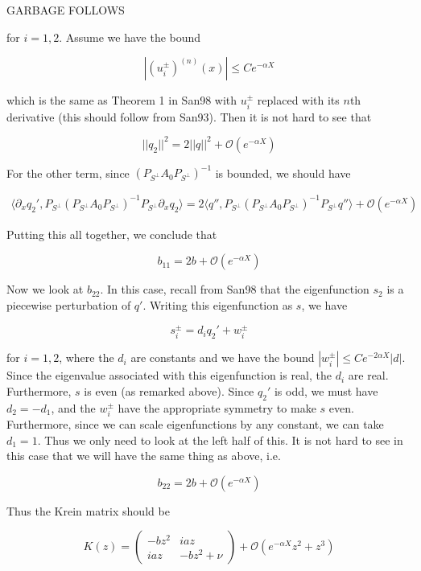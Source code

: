 \documentclass[12pt]{article}
\begin{document}
GARBAGE FOLLOWS

for $i = 1, 2$. Assume we have the bound

\[
|(u_i^\pm)^{(n)}(x)| \leq C e^{-\alpha X}
\] 

which is the same as Theorem 1 in San98 with $u_i^\pm$ replaced with its $n$th derivative (this should follow from San93). Then it is not hard to see that 

\[
||q_2||^2 = 2 ||q||^2 + \mathcal{O}(e^{-\alpha X})
\]

For the other term, since $(P_{S^\perp} A_0 P_{S^\perp})^{-1}$ is bounded, we should have

\begin{align*}
\langle \partial_x q_2', P_{S^\perp} (P_{S^\perp} A_0 P_{S^\perp})^{-1} P_{S^\perp} \partial_x q_2 \rangle 
= 2 \langle q'', P_{S^\perp} (P_{S^\perp} A_0 P_{S^\perp})^{-1} P_{S^\perp} q'' \rangle + \mathcal{O}(e^{-\alpha X})
\end{align*}

Putting this all together, we conclude that 

\[
b_{11} = 2b + \mathcal{O}(e^{-\alpha X})
\]

Now we look at $b_{22}$. In this case, recall from San98 that the eigenfunction $s_2$ is a piecewise perturbation of $q'$. Writing this eigenfunction as $s$, we have

\[
s_i^\pm = d_i q_2' + w_i^\pm
\]

for $i = 1, 2$, where the $d_i$ are constants and we have the bound $|w_i^\pm| \leq C e^{-2 \alpha X}|d|$. Since the eigenvalue associated with this eigenfunction is real, the $d_i$ are real. Furthermore, $s$ is even (as remarked above). Since $q_2'$ is odd, we must have $d_2 = -d_1$, and the $w_i^\pm$ have the appropriate symmetry to make $s$ even. Furthermore, since we can scale eigenfunctions by any constant, we can take $d_1 = 1$. Thus we only need to look at the left half of this. It is not hard to see in this case that we will have the same thing as above, i.e. 

\[
b_{22} = 2b + \mathcal{O}(e^{-\alpha X})
\]

Thus the Krein matrix should be

\begin{equation}
K(z) = \begin{pmatrix}
-b z^2 & i a z \\
i a z & -b z^2 + \nu
\end{pmatrix} + \mathcal{O}(e^{-\alpha X} z^2 + z^3)
\end{equation}
\end{document}
